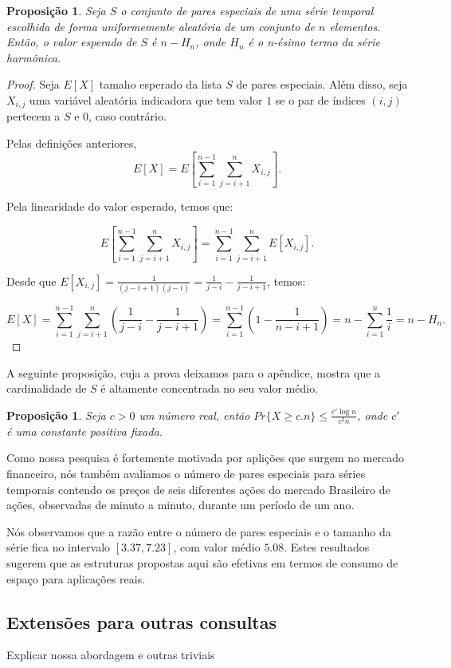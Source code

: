 \documentclass[12pt]{article}
\newtheorem{prop}[thm]{Proposição}
\begin{document}
\begin{prop}
Seja $S$ o conjunto de pares especiais de uma série 
temporal escolhida de forma uniformemente aleatória de um conjunto de $n$ elementos.
Então, o valor esperado de $S$ é $n - H_n$, onde $H_n$ é o n-ésimo termo 
da série harmônica.
\end{prop}
\begin{proof}
Seja $E[X]$ tamaho esperado da lista $S$ de pares especiais.
Além disso, seja $X_{i,j}$ uma variável aleatória indicadora que
tem valor $1$ se o par de índices $(i,j)$ pertecem a $S$ e $0$, caso contrário.

Pelas definições anteriores, 
$$E[X] = E[\sum\limits_{i=1}^{n-1} \sum\limits_{j=i+1}^{n}X_{i,j}].$$

Pela linearidade do valor esperado, temos que:

$$E[\sum\limits_{i=1}^{n-1} \sum\limits_{j=i+1}^{n}X_{i,j}] = \sum\limits_{i=1}^{n-1} \sum\limits_{j=i+1}^{n} E[X_{i,j}].$$

Desde que $E[X_{i,j}] = \frac{1}{(j-i+1)(j-i)} = \frac{1}{j-i} - \frac{1}{j-i+1}$, temos:

$$E[X] = \sum\limits_{i=1}^{n-1} \sum\limits_{j=i+1}^{n}
\left (\frac{1}{j-i} - \frac{1}{j-i+1} \right )
= \sum\limits_{i=1}^{n-1} \left (1 - \frac{1}{n-i+1} \right)
= n - \sum\limits_{i=1}^{n} \frac{1}{i}  =  n - H_n.$$
\end{proof}

A seguinte proposição, cuja a prova deixamos para o apêndice, mostra que 
a cardinalidade de $S$ é altamente concentrada no seu valor médio.

\begin{prop}
Seja $c>0$ um número real, então $Pr\{X \ge c.n\} \le \frac{c' \log n}{c^2n}$, onde
$c'$ é uma constante positiva fixada.
\end{prop}

Como nossa pesquisa é fortemente motivada por aplições que surgem no mercado
financeiro, nós também avaliamos o número de pares especiais para séries temporais
contendo os preços de seis diferentes ações do mercado Brasileiro de ações, observadas
de minuto a minuto, durante um período de um ano. 

Nós observamos que a razão entre o número de pares especiais e o tamanho da série fica no intervalo
$[3.37, 7.23]$, com valor médio $5.08$. Estes resultados sugerem que as estruturas propostas aqui são
 efetivas em termos de consumo de espaço para aplicações reais.  


\subsection{Extensões para outras consultas}
 Explicar nossa abordagem e outras triviais
\end{document}

